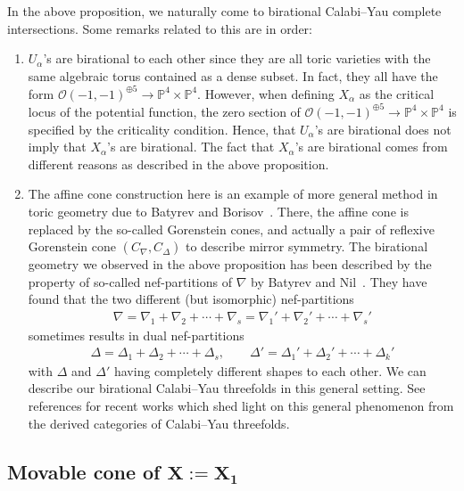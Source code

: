 \documentclass[pdftex]{sigma}
\numberwithin{equation}{section}
\begin{document}
\begin{Remark} \label{rem:Bat-Nil} In the above proposition, we naturally come to birational Calabi--Yau complete intersections. Some remarks related to this are in order:
\begin{enumerate}\itemsep=0pt
\item $U_{\alpha}$'s are birational to each other since they are all toric varieties with the same algebraic torus contained as a dense subset. In fact, they all have the form $\mathcal{O}(-1,-1)^{\oplus5}\to\mathbb{P}^{4}\times\mathbb{P}^{4}$. However, when defining $X_{\alpha}$ as the critical locus of the potential function, the zero section of $\mathcal{O}(-1,-1)^{\oplus5}\to\mathbb{P}^{4}\times\mathbb{P}^{4}$ is specified by the criticality condition. Hence, that $U_{\alpha}$'s are birational does not imply that $X_{\alpha}$'s are birational. The fact that $X_{\alpha}$'s are birational comes from different reasons as described in the above proposition.

\item The affine cone construction here is an example of more general method in toric geometry due to Batyrev and Borisov~\cite{BatBo}. There, the affine cone is replaced by the so-called Gorenstein cones, and actually a pair of reflexive Gorenstein cone $(C_{\nabla},C_{\Delta})$ to describe mirror symmetry. The birational geometry we observed in the above proposition has been described by the property of so-called nef-partitions of $\nabla$ by Batyrev and Nil~\cite{BatNil}. They have found that the two different (but isomorphic) nef-partitions
\begin{gather*}
\nabla=\nabla_{1}+\nabla_{2}+\cdots+\nabla_{s}=\nabla_{1}'+\nabla_{2}'+\cdots+\nabla_{s}'
\end{gather*}
sometimes results in dual nef-partitions
\begin{gather*}
\Delta=\Delta_{1}+\Delta_{2}+\cdots+\Delta_{s},\qquad \Delta'=\Delta_{1}'+\Delta_{2}'+\cdots+\Delta_{k}'
\end{gather*}
with $\Delta$ and $\Delta'$ having completely different shapes to each other. We can describe our birational Calabi--Yau threefolds in this general setting. See references \cite{BoLi, FavKel} for recent works which shed light on this general phenomenon from the derived categories of Calabi--Yau threefolds.
\end{enumerate}
\end{Remark}

\subsection[Movable cone of $X:=X_{1}$]{Movable cone of $\boldsymbol{X:=X_{1}}$} \label{sub:Movable-cone}
\end{document}
